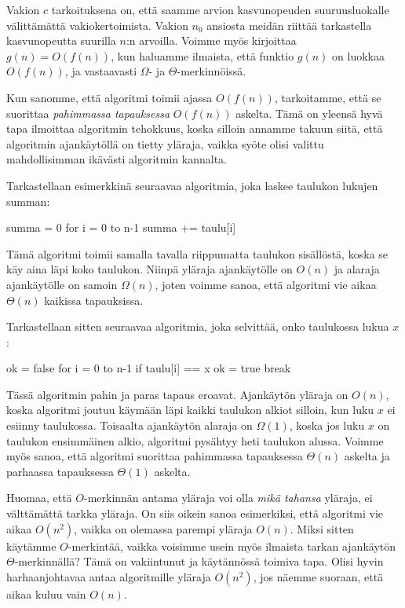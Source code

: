 Vakion $c$ tarkoituksena on, että saamme arvion kasvunopeuden suuruusluokalle välittämättä
vakiokertoimista. Vakion $n_0$ ansiosta meidän riittää tarkastella
kasvunopeutta suurilla $n$:n arvoilla.
Voimme myös kirjoittaa $g(n)=O(f(n))$, kun haluamme ilmaista,
että funktio $g(n)$ on luokkaa $O(f(n))$,
ja vastaavasti $\Omega$- ja $\Theta$-merkinnöissä.

Kun sanomme, että algoritmi toimii ajassa $O(f(n))$, tarkoitamme, että se suorittaa
\emph{pahimmassa tapauksessa} $O(f(n))$ askelta.
Tämä on yleensä hyvä tapa ilmoittaa algoritmin tehokkuus,
koska silloin annamme takuun siitä, että algoritmin ajankäytöllä on tietty yläraja,
vaikka syöte olisi valittu mahdollisimman ikävästi algoritmin kannalta.

Tarkastellaan esimerkkinä seuraavaa algoritmia, joka laskee
taulukon lukujen summan:

\begin{code}
    summa = 0
    for i = 0 to n-1
    summa += taulu[i]
\end{code}

Tämä algoritmi toimii samalla tavalla riippumatta taulukon sisällöstä,
koska se käy aina läpi koko taulukon.
Niinpä yläraja ajankäytölle on $O(n)$ ja alaraja ajankäytölle on samoin $\Omega(n)$,
joten voimme sanoa, että algoritmi vie aikaa $\Theta(n)$ kaikissa tapauksissa.

Tarkastellaan sitten seuraavaa algoritmia, joka selvittää,
onko taulukossa lukua $x$:

\begin{code}
    ok = false
    for i = 0 to n-1
    if taulu[i] == x
    ok = true
    break
\end{code}

Tässä algoritmin pahin ja paras tapaus eroavat.
Ajankäytön yläraja on $O(n)$, koska algoritmi joutuu käymään
läpi kaikki taulukon alkiot silloin, kun luku $x$
ei esiinny taulukossa.
Toisaalta ajankäytön alaraja on $\Omega(1)$,
koska jos luku $x$ on taulukon ensimmäinen alkio,
algoritmi pysähtyy heti taulukon alussa.
Voimme myös sanoa, että algoritmi suorittaa pahimmassa
tapauksessa $\Theta(n)$ askelta ja parhaassa tapauksessa
$\Theta(1)$ askelta.

Huomaa, että $O$-merkinnän antama yläraja voi olla
\emph{mikä tahansa} yläraja, ei välttämättä tarkka yläraja.
On siis oikein sanoa esimerkiksi, että
algoritmi vie aikaa $O(n^2)$, vaikka on olemassa parempi yläraja $O(n)$.
Miksi sitten käytämme $O$-merkintää, vaikka voisimme usein myös ilmaista tarkan
ajankäytön $\Theta$-merkinnällä?
Tämä on vakiintunut ja käytännössä toimiva tapa.
Olisi hyvin harhaanjohtavaa antaa algoritmille yläraja $O(n^2)$,
jos näemme suoraan, että aikaa kuluu vain $O(n)$.

